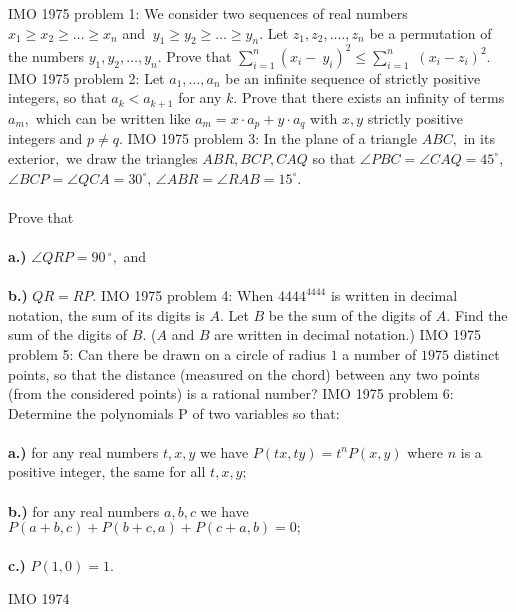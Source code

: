 IMO 1975 problem 1:  We consider two sequences of real numbers $x_1 \geq x_2 \geq \ldots \geq x_n$ and $\ y_1 \geq y_2 \geq \ldots \geq y_n.$ Let $z_1, z_2, .\ldots, z_n$ be a permutation of the numbers $y_1, y_2, \ldots, y_n.$ Prove that $\sum \limits_{i=1}^n ( x_i -\ y_i )^2 \leq \sum \limits_{i=1}^n$ $( x_i - z_i)^2.$ 
IMO 1975 problem 2:  Let $a_1, \ldots, a_n$ be an infinite sequence of strictly positive integers, so that $a_k < a_{k+1}$ for any $k.$ Prove that there exists an infinity of terms $ a_m,$ which can be written like $a_m = x \cdot a_p + y \cdot a_q$ with $x,y$ strictly positive integers and $p \neq q.$ 
IMO 1975 problem 3:  In the plane of a triangle $ABC,$ in its exterior$,$ we draw the triangles $ABR, BCP, CAQ$ so that $\angle PBC = \angle CAQ = 45^{\circ}$, $\angle BCP = \angle QCA = 30^{\circ}$, $\angle ABR = \angle RAB = 15^{\circ}$. \\\\
Prove that \\\\
\textbf{a.)} $\angle QRP = 90\,^{\circ},$ and \\\\
\textbf{b.)} $QR = RP.$ 
IMO 1975 problem 4:  When $4444^{4444}$ is written in decimal notation, the sum of its digits is $ A.$ Let $B$ be the sum of the digits of $A.$ Find the sum of the digits of $ B.$ ($A$ and $B$ are written in decimal notation.) 
IMO 1975 problem 5:  Can there be drawn on a circle of radius $1$ a number of $1975$ distinct points, so that the distance (measured on the chord) between any two points (from the considered points) is a rational number? 
IMO 1975 problem 6:  Determine the polynomials P of two variables so that: \\\\
\textbf{a.)} for any real numbers $t,x,y$ we have $P(tx,ty) = t^n P(x,y)$ where $n$ is a positive integer, the same for all $t,x,y;$ \\\\
\textbf{b.)} for any real numbers $a,b,c$ we have $P(a + b,c) + P(b + c,a) + P(c + a,b) = 0;$ \\\\
\textbf{c.)} $P(1,0) =1.$ 

IMO 1974 

